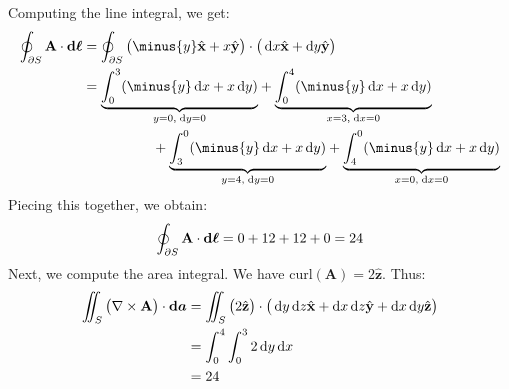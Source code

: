             \begin{solution}
                Computing the line integral, we get:
                \begin{subequations}
                    \begin{align}
                        \oint_{\partial S}
                            \mathbf{A}\cdot\boldsymbol{\diff{\ell}}
                        &=\oint_{\partial{S}}
                            \big(\minus{y}\hat{\mathbf{x}}
                        +x\hat{\mathbf{y}}\big)
                        \cdot\big(\diff{x}\hat{\mathbf{x}}
                        +\diff{y}\hat{\mathbf{y}}\big)\\
                        \nonumber&=
                        \underset{{y=0,\;\diff{y}=0}}
                        {\underbrace{\int_{0}^{3}%
                            (\minus{y}\diff{x}+x\diff{y})}}
                        +\underset{x=3,\;\diff{x}=0}
                        {\underbrace{\int_{0}^{4}%
                            (\minus{y}\diff{x}+x\diff{y})}}\\
                        &\quad\quad\quad\quad\quad
                        +\underset{y=4,\;\diff{y}=0}
                        {\underbrace{\int_{3}^{0}%
                            (\minus{y}\diff{x}+x\diff{y})}}
                        +\underset{x=0,\;\diff{x}=0}
                        {\underbrace{\int_{4}^{0}%
                            (\minus{y}\diff{x}+x\diff{y})}}
                    \end{align}
                \end{subequations}
                Piecing this together, we obtain:
                \begin{equation}
                    \oint_{\partial S}
                        \mathbf{A}\cdot\boldsymbol{\mathop{}\!\mathrm{d}{\ell}}
                    =0+12+12+0=24
                \end{equation}
                Next, we compute the area integral. We have
                $\mathrm{curl}(\mathbf{A})=2\hat{\mathbf{z}}$.
                Thus:
                \begin{subequations}
                    \begin{align}
                        \iint_{S}\big(\nabla\times\mathbf{A}\big)
                            \cdot\boldsymbol{\diff{a}}
                        &=\iint_{S}\big(2\hat{\mathbf{z}}\big)
                            \cdot\big(
                             \diff{y}\diff{z}\hat{\mathbf{x}}
                            +\diff{x}\diff{z}\hat{\mathbf{y}}
                            +\diff{x}\diff{y}\hat{\mathbf{z}}\big)\\
                        &=\int_{0}^{4}\int_{0}^{3}2\diff{y}\diff{x}\\
                        &=24
                    \end{align}
                \end{subequations}
            \end{solution}
